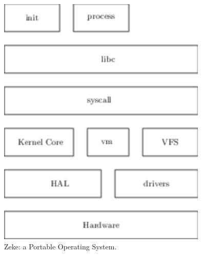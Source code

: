 \begin{figure}
  \includegraphics[width=10cm]{pics/zeke}
  \centering
  \caption{Zeke: a Portable Operating System.}
  \label{figure:zeke}
\end{figure}


